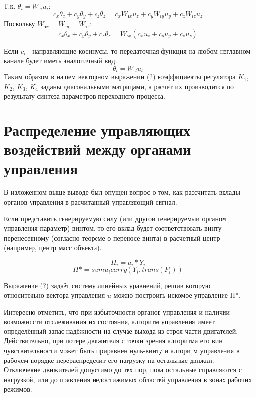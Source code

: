\documentclass[a4paper]{article}
\begin{document}
Т.к. $\theta_i = W_{зi} u_i$:
\begin{equation}
c_x\theta_x + c_y\theta_y + c_z\theta_z = c_xW_{зx} u_z + c_yW_{зy} u_y + c_zW_{зz} u_z 
\end{equation}
Поскольку $W_{зx} = W_{зy} = W_{зz}$:
\begin{equation}
c_x\theta_x + c_y\theta_y + c_z\theta_z = W_{зx} (c_xu_z + c_yu_y + c_zu_z)
\end{equation}

Если $c_i$ - направляющие косинусы, то передаточная функция на любом неглавном канале будет иметь аналогичный вид.
\begin{equation}
\theta_l = W_{зl} u_l 
\end{equation}
Таким образом в нашем векторном выражении (?) коэффициенты регулятора $K_1$, $K_2$, $K_3$, $K_4$ заданы диагональными матрицами, а расчет их производится по результату синтеза параметров переходного процесса.

\section{Распределение управляющих воздействий между органами управления}
В изложенном выше выводе был опущен вопрос о том, как рассчитать вклады органов управления в расчитанный управляющий сигнал.

Если представить генерируемую силу (или другой генерируемый органом управления параметр) винтом, то его вклад будет соответствовать винту перенесенному (согласно теореме о переносе винта) в расчетный центр (например, центр масс объекта). 

\begin{equation}
H_i = u_i * Y_i
\end{equation}
\begin{equation}
H* = sum u_i carry(Y_i, trans(P_i))  
\end{equation}

Выражение (?) задаёт систему линейных уравнений, решив которую относительно вектора управления $u$ можно построить искомое управление H*.

Интересно отметить, что при избыточности органов управления и наличии возможности отслеживания их состояния, алгоритм управления имеет определённый запас надёжности на случае выхода из строя части двигателей. Действительно, при потере движителя с точки зрения алгоритма его винт чувствительности может быть приравнен нуль-винту и алгоритм управления в рабочем порядке перераспределит его нагрузку на остальные движки. Отключение движителей допустимо до тех пор, пока остальные справляются с нагрузкой, или до появления недостижимых областей управления в зонах рабочих режимов.  
\end{document}
